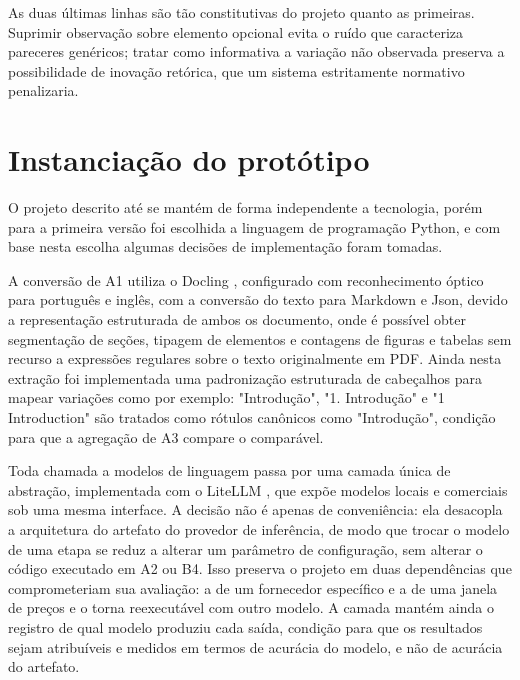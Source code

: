 As duas últimas linhas são tão constitutivas do projeto quanto as primeiras. Suprimir observação sobre elemento opcional evita o ruído que caracteriza pareceres genéricos; tratar como informativa a variação não observada preserva a possibilidade de inovação retórica, que um sistema estritamente normativo penalizaria.



\section{Instanciação do protótipo}
\label{sec:instanciacao}

O projeto descrito até se mantém de forma independente a tecnologia, porém para a primeira versão foi escolhida a linguagem de programação Python, e com base nesta escolha algumas decisões de implementação foram tomadas.

A conversão de A1 utiliza o Docling \cite{Docling}, configurado com reconhecimento óptico para português e inglês, com a conversão do texto para Markdown e Json, devido a representação estruturada de ambos os documento, onde é possível obter segmentação de seções, tipagem de elementos e contagens de figuras e tabelas sem recurso a expressões regulares sobre o texto originalmente em PDF. Ainda nesta extração foi implementada uma padronização estruturada de cabeçalhos para mapear variações como por exemplo: "Introdução", "1. Introdução" e "1 Introduction" são tratados como rótulos canônicos como "Introdução", condição para que a agregação de A3 compare o comparável.

Toda chamada a modelos de linguagem passa por uma camada única de abstração, implementada com o LiteLLM \cite{LiteLLM}, que expõe modelos locais e comerciais sob uma mesma interface. A decisão não é apenas de conveniência: ela desacopla a arquitetura do artefato do provedor de inferência, de modo que trocar o modelo de uma etapa se reduz a alterar um parâmetro de configuração, sem alterar o código executado em A2 ou B4. Isso preserva o projeto em duas dependências que comprometeriam sua avaliação: a de um fornecedor específico e a de uma janela de preços e o torna reexecutável com outro modelo. A camada mantém ainda o registro de qual modelo produziu cada saída, condição para que os resultados sejam atribuíveis e medidos em termos de acurácia do modelo, e não de acurácia do artefato.

